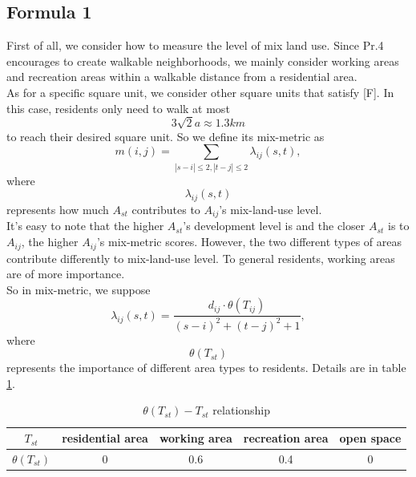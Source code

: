 \subsection{Formula 1}
First of all, we consider how to measure the level of mix land use.
Since Pr.4 encourages to create walkable neighborhoods, we mainly consider working areas and recreation areas within a walkable distance from a residential area.
\\
As for a specific square unit, we consider other square units that satisfy [F].
In this case, residents only need to walk at most $$ 3 \sqrt{2} a \approx 1.3km $$ to reach their desired square unit.
So we define its mix-metric as $$ m(i,j) = \sum_{|s-i| \leq 2, |t-j| \leq 2} \lambda_{ij}(s,t), $$ where $$ \lambda_{ij}(s,t) $$ represents how much $ A_{st} $ contributes to $ A_{ij} $'s mix-land-use level.
\\
It's easy to note that the higher $ A_{st} $'s development level is and the closer $ A_{st} $ is to $ A_{ij} $, the higher $ A_{ij} $'s mix-metric scores.
However, the two different types of areas contribute differently to mix-land-use level.
To general residents, working areas are of more importance.
\\
So in mix-metric, we suppose $$ \lambda_{ij}(s,t) = \frac{d_{ij} \cdot \theta (T_{ij})}{(s-i)^2 + (t-j)^2 + 1}, $$ where $$ \theta (T_{st}) $$ represents the importance of different area types to residents. Details are in table \ref{tab:formula-1}.
\\
\begin{table}[tb]
\centering
  \begin{tabular}{c|cccc}
    \hline
    $ T_{st} $ & residential area & working area & recreation area & open space \\
    \hline
    $ \theta (T_{st}) $ & 0 & 0.6 & 0.4 & 0 \\
    \hline
  \end{tabular}
  \caption{$ \theta (T_{st}) - T_{st} $ relationship}
  \label{tab:formula-1}
\end{table}
